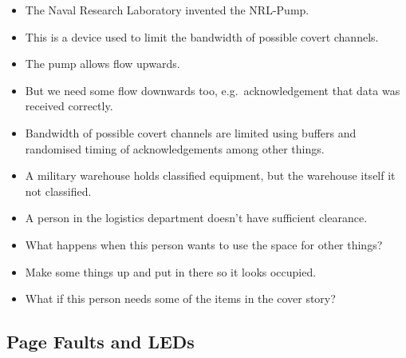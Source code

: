 \documentclass{beamer}
\begin{document}
\begin{frame}
  \begin{itemize}
    \item The Naval Research Laboratory invented the NRL-Pump.

    \item This is a device used to limit the bandwidth of possible covert 
      channels.

    \item The pump allows flow upwards.

    \item But we need some flow downwards too, e.g.\ acknowledgement that data 
      was received correctly.

    \item Bandwidth of possible covert channels are limited using buffers and 
      randomised timing of acknowledgements among other things.
  \end{itemize}
\end{frame}

\begin{frame}
  \begin{example}
    \begin{itemize}
      \item A military warehouse holds classified equipment, but the warehouse 
        itself it not classified.

      \item A person in the logistics department doesn't have sufficient 
        clearance.

      \item What happens when this person wants to use the space for other 
        things?

      \item Make some things up and put in there so it looks occupied.

      \item What if this person needs some of the items in the cover story?

    \end{itemize}
  \end{example}
\end{frame}

\subsection{Page Faults and LEDs}
\end{document}
